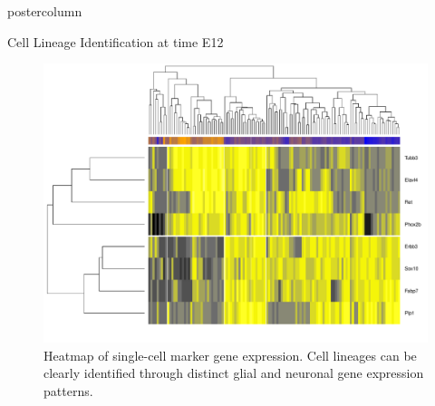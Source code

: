 \documentclass{beamer}
\begin{document}
\begin{frame}
\begin{columns}
\begin{column}{.45\textwidth}
\begin{beamercolorbox}[center]{postercolumn}
\begin{minipage}{.98\textwidth}
{\begin{myblock}{Cell Lineage Identification at time E12}
\begin{figure}
\begin{minipage}{0.45\textwidth}
	\centering\includegraphics[width=1.0\textwidth]{./heatmap}
	\caption{Heatmap of single-cell marker gene expression.
			Cell lineages can be clearly identified through distinct
			glial and neuronal gene expression patterns.}
	\label{fig:heatmap}
\end{minipage}


\end{figure}
\end{myblock}}
\end{minipage}
\end{beamercolorbox}
\end{column}
\end{columns}
\end{frame}
\end{document}
